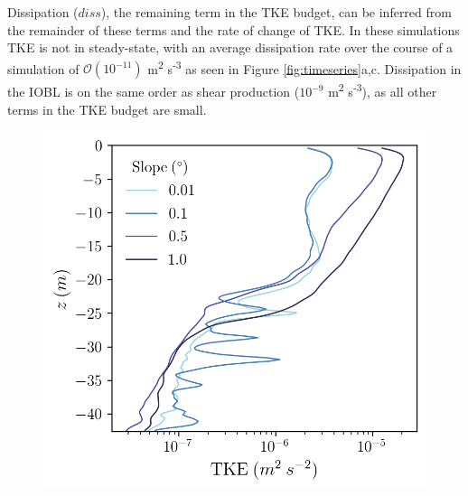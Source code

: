 \documentclass[draft]{agujournal2019}
\begin{document}
Dissipation ($diss$), the remaining term in the TKE budget, can be inferred from the remainder of these terms and the rate of change of TKE. In these simulations TKE is not in steady-state, with an average  dissipation rate over the course of a simulation of $\mathcal{O}(10^{-11})$ m\textsuperscript{2} s\textsuperscript{-3} as seen in Figure \ref{fig:timeseries}a,c. Dissipation in the IOBL is on the same order as shear production ($10^{-9}$ m\textsuperscript{2} s\textsuperscript{-3}), as all other terms in the TKE budget are small. 

\begin{figure}
    \centering
    \begin{minipage}{0.5\textwidth}
        \includegraphics[trim={0 0 0 0},clip, width=\textwidth]{Figures/eres_cmp_dslope_43h_tav13h_z_profile.png}
    \end{minipage}%
    \begin{minipage}{0.5\textwidth}

\end{minipage}
\end{figure}
\end{document}
